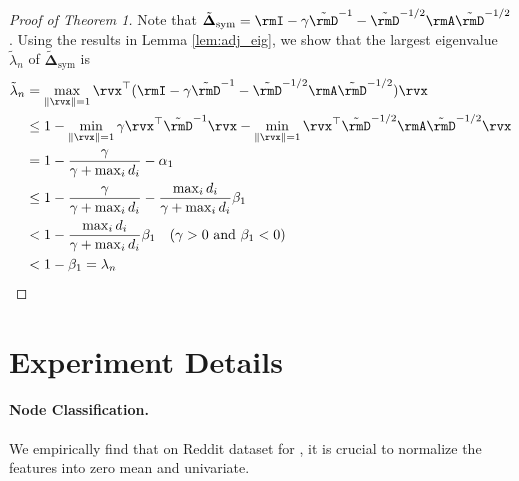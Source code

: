 \begin{proof} [Proof of Theorem 1] 
Note that $\tilde{\boldsymbol{\Delta}}_{\text{sym}} = \rmI - \gamma \tilde{\rmD}^{-1} - \tilde{\rmD}^{-1/2}\rmA\tilde{\rmD}^{-1/2}$. Using the results in Lemma \autoref{lem:adj_eig}, we show that the largest eigenvalue $\tilde{\lambda}_n$ of $\tilde{\boldsymbol{\Delta}}_{\text{sym}}$ is
\begin{align} \label{eq:bound_laplacians}
        \tilde{\lambda}_n  & = \max_{\|\rvx\|=1} \rvx^\top(\rmI - \gamma \tilde{\rmD}^{-1} - \tilde{\rmD}^{-1/2}\rmA\tilde{\rmD}^{-1/2})\rvx  \nonumber \\
               & \leq  1 - \min_{\|\rvx\|=1} \gamma \rvx^\top \tilde{\rmD}^{-1} \rvx - \min_{\|\rvx\|=1} \rvx^\top \tilde{\rmD}^{-1/2} \rmA \tilde{\rmD}^{-1/2} \rvx \nonumber \\
               & = 1 - \frac{\gamma}{\gamma + \max_{i} d_i} - \alpha_1 \nonumber \\
               & \leq  1 - \frac{\gamma}{\gamma + \max_{i} d_i} - \frac{\max_i d_i}{\gamma + \max_i d_i} \beta_1 \nonumber \\
               & <  1 - \frac{\max_i d_i}{\gamma + \max_i d_i} \beta_1 \quad (\gamma > 0 \text{ and } \beta_1 < 0) \nonumber \\
               & < 1 - \beta_1 = \lambda_n
\end{align}


\end{proof}

\section{Experiment Details}
\label{sec:exp-details}
\paragraph{Node Classification.}
We empirically find that on Reddit dataset for \method{}, it is crucial to normalize the features into zero mean and univariate. 

